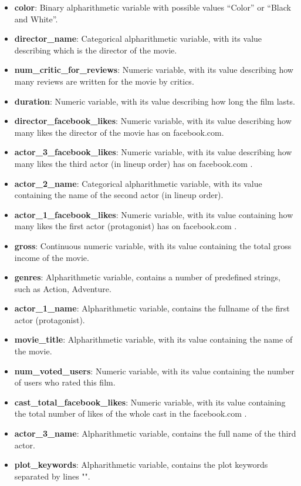 \documentclass[letterpaper,twocolumn,10pt]{article}
\begin{document}
\begin{itemize}
\item \textbf{color}: Binary alpharithmetic variable with possible values “Color” or “Black and White”.
\item \textbf{director\_name}: Categorical alpharithmetic variable, with its value describing which is the director of the movie.
\item \textbf{num\_critic\_for\_reviews}: Numeric variable, with its value describing how many reviews are written for the movie by critics.
\item \textbf{duration}: Numeric variable, with its value describing how long the film lasts.
\item \textbf{director\_facebook\_likes}: Numeric variable, with its value describing how many likes the director of the movie has on facebook.com.
\item \textbf{actor\_3\_facebook\_likes}: Numeric variable, with its value describing how many likes the third actor (in lineup order) has on facebook.com .
\item \textbf{actor\_2\_name}: Categorical alpharithmetic variable, with its value containing the name of the second actor (in lineup order).
\item \textbf{actor\_1\_facebook\_likes}: Numeric variable, with its value containing how many likes the first actor (protagonist) has on facebook.com .
\item \textbf{gross}: Continuous numeric variable, with its value containing the total gross income of the movie.
\item \textbf{genres}: Alpharithmetic variable, contains a number of predefined strings, such as Action, Adventure.
\item \textbf{actor\_1\_name}: Alpharithmetic variable, contains the fullname of the first actor (protagonist).
\item \textbf{movie\_title}: Alpharithmetic variable, with its value containing the name of the movie.
\item \textbf{num\_voted\_users}: Numeric variable, with its value containing the number of users who rated this film.
\item \textbf{cast\_total\_facebook\_likes}: Numeric variable, with its value containing the total number of likes of the whole cast in the facebook.com .
\item \textbf{actor\_3\_name}: Alpharithmetic variable, contains the full name of the third actor.
\item \textbf{plot\_keywords}: Alpharithmetic variable, contains the plot keywords separated by lines "\textbar".

\end{itemize}
\end{document}
